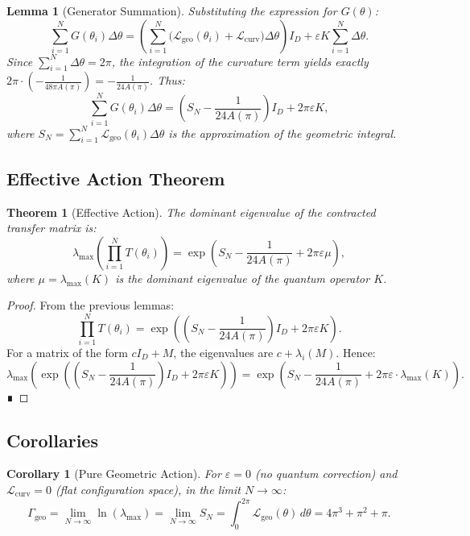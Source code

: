 \documentclass[12pt]{article}
\newtheorem{theorem}{Theorem}
\newtheorem{lemma}{Lemma}
\newtheorem{corollary}{Corollary}
\begin{document}
\begin{lemma}[Generator Summation]
Substituting the expression for $G(\theta)$:
\[
\sum_{i=1}^{N} G(\theta_i) \Delta\theta = \left(\sum_{i=1}^{N}
\big(\mathcal{L}_{\text{geo}}(\theta_i) + \mathcal{L}_{\text{curv}}\big) \Delta\theta\right) I_D
+ \varepsilon K \sum_{i=1}^{N} \Delta\theta.
\]
Since $\sum_{i=1}^{N} \Delta\theta = 2\pi$, the integration of the curvature term yields
exactly $2\pi \cdot \left(-\frac{1}{48\pi A(\pi)}\right) = -\frac{1}{24A(\pi)}$. Thus:
\[
\sum_{i=1}^{N} G(\theta_i) \Delta\theta = \left(S_N - \frac{1}{24A(\pi)}\right) I_D + 2\pi \varepsilon K,
\]
where $S_N = \sum_{i=1}^{N} \mathcal{L}_{\text{geo}}(\theta_i) \Delta\theta$ is the
approximation of the geometric integral.
\end{lemma}

\subsection{Effective Action Theorem}

\begin{theorem}[Effective Action]
The dominant eigenvalue of the contracted transfer matrix is:
\[
\lambda_{\max}\left(\prod_{i=1}^{N} T(\theta_i)\right)
= \exp\left(S_N - \frac{1}{24A(\pi)} + 2\pi \varepsilon \mu\right),
\]
where $\mu = \lambda_{\max}(K)$ is the dominant eigenvalue of the quantum operator $K$.
\end{theorem}

\begin{proof}
From the previous lemmas:
\[
\prod_{i=1}^{N} T(\theta_i) = \exp\left(\left(S_N - \frac{1}{24A(\pi)}\right) I_D + 2\pi \varepsilon K\right).
\]
For a matrix of the form $c I_D + M$, the eigenvalues are $c + \lambda_i(M)$. Hence:
\[
\lambda_{\max}\left(\exp\left(\left(S_N - \frac{1}{24A(\pi)}\right) I_D + 2\pi \varepsilon K\right)\right)
= \exp\left(S_N - \frac{1}{24A(\pi)} + 2\pi \varepsilon \cdot \lambda_{\max}(K)\right).
\]
∎
\end{proof}

\subsection{Corollaries}

\begin{corollary}[Pure Geometric Action]
For $\varepsilon = 0$ (no quantum correction) and $\mathcal{L}_{\text{curv}} = 0$
(flat configuration space), in the limit $N \to \infty$:
\[
\Gamma_{\text{geo}} = \lim_{N\to\infty} \ln\left(\lambda_{\max}\right)
= \lim_{N\to\infty} S_N = \int_0^{2\pi} \mathcal{L}_{\text{geo}}(\theta) \, d\theta
= 4\pi^3 + \pi^2 + \pi.
\]
\end{corollary}
\end{document}
